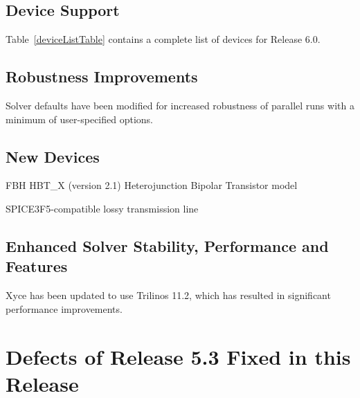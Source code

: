 \documentclass[11pt,report,strict]{SANDreport}
\begin{document}
\subsection{Device Support}

Table~\ref{deviceListTable} contains a complete list of devices 
for \Xyce{} Release 6.0.


\subsection{Robustness Improvements}
\begin{XyceItemize}
\item Solver defaults have been modified for increased robustness of
  parallel runs with a minimum of user-specified options.
\end{XyceItemize}

\subsection{New Devices}
\begin{XyceItemize}
\item FBH HBT\_X (version 2.1) Heterojunction Bipolar Transistor model
\item SPICE3F5-compatible lossy transmission line
\end{XyceItemize}

\subsection{Enhanced Solver Stability, Performance and Features}
\begin{XyceItemize}
\item Xyce has been updated to use Trilinos 11.2, which has resulted in significant performance improvements.
\end{XyceItemize}


\newpage
\section{Defects of Release 5.3 Fixed in this Release}
\end{document}
